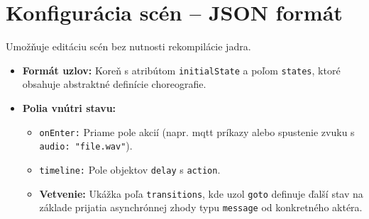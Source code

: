 \section{Konfigurácia scén -- JSON formát}
\label{KonfiguraciaScen}

Umožňuje editáciu scén bez nutnosti rekompilácie jadra.
\begin{itemize}
    \item \textbf{Formát uzlov:} Koreň s atribútom \texttt{initialState} a poľom \texttt{states}, ktoré obsahuje abstraktné definície choreografie.
    \item \textbf{Polia vnútri stavu:}
    \begin{itemize}
        \item \texttt{onEnter:} Priame pole akcií (napr. mqtt príkazy alebo spustenie zvuku s \texttt{audio: "file.wav"}).
        \item \texttt{timeline:} Pole objektov \texttt{delay} s \texttt{action}.
        \item \textbf{Vetvenie:} Ukážka poľa \texttt{transitions}, kde uzol \texttt{goto} definuje ďalší stav na základe prijatia asynchrónnej zhody typu \texttt{message} od konkretného aktéra.
    \end{itemize}
\end{itemize}
